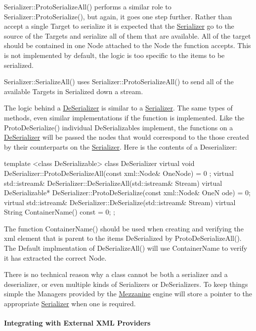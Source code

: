 \par
 Serializer::ProtoSerializeAll() performs a similar role to Serializer::ProtoSerialize(), but again, it goes one step further. Rather than accept a single Target to serialize it is expected that the \hyperlink{classMezzanine_1_1Serializer}{Serializer} go to the source of the Targets and serialize all of them that are available. All of the target should be contained in one Node attached to the Node the function accepts. This is not implemented by default, the logic is too specific to the items to be serialized. \par
 \par
 Serializer::SerializeAll() uses Serializer::ProtoSerializeAll() to send all of the available Targets in Serialized down a stream. \par
 \par
 The logic behind a \hyperlink{classMezzanine_1_1DeSerializer}{DeSerializer} is similar to a \hyperlink{classMezzanine_1_1Serializer}{Serializer}. The same types of methods, even similar implementations if the function is implemented. Like the ProtoDeSerialize() individual DeSerializables implement, the functions on a \hyperlink{classMezzanine_1_1DeSerializer}{DeSerializer} will be passed the nodes that would correspond to the those created by their counterparts on the \hyperlink{classMezzanine_1_1Serializer}{Serializer}. Here is the contents of a Deserializer: 
\begin{DoxyCode}
 template <class DeSerializable> class DeSerializer
 {
     virtual void DeSerializer::ProtoDeSerializeAll(const xml::Node& OneNode) = 0
      ;
     virtual std::istream& DeSerializer::DeSerializeAll(std::istream& Stream)
     virtual DeSerializable* DeSerializer::ProtoDeSerialize(const xml::Node& OneN
      ode) = 0;
     virtual std::istream& DeSerializer::DeSerialize(std::istream& Stream)
     virtual String ContainerName() const = 0;
 };
\end{DoxyCode}
 The function ContainerName() should be used when creating and verifying the xml element that is parent to the items DeSerialized by ProtoDeSerializeAll(). The Default implmentation of DeSerializeAll() will use ContainerName to verify it has extracted the correct Node. \par
 \par
 There is no technical reason why a class cannot be both a serializer and a deserializer, or even multiple kinds of Serializers or DeSerializers. To keep things simple the Managers provided by the \hyperlink{namespaceMezzanine}{Mezzanine} engine will store a pointer to the appropriate \hyperlink{classMezzanine_1_1Serializer}{Serializer} when one is required. \hypertarget{Serialization_serializationlegacy}{}\paragraph{Integrating with External XML Providers}\label{Serialization_serializationlegacy}
